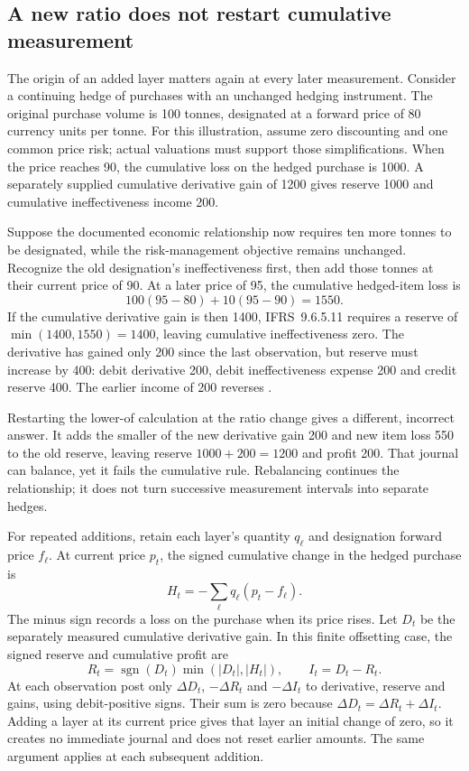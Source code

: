 \subsection{A new ratio does not restart cumulative measurement}
\label{sec:repeated-item-rebalancing}

The origin of an added layer matters again at every later measurement.
Consider a continuing hedge of purchases with an unchanged hedging
instrument. The original purchase volume is 100 tonnes, designated at a
forward price of 80 currency units per tonne. For this illustration, assume
zero discounting and one common price risk; actual valuations must support
those simplifications. When the price reaches 90, the cumulative loss on
the hedged purchase is 1000. A separately supplied cumulative derivative
gain of 1200 gives reserve 1000 and cumulative ineffectiveness income 200.

Suppose the documented economic relationship now requires ten more tonnes
to be designated, while the risk-management objective remains unchanged.
Recognize the old designation's ineffectiveness first, then add those tonnes
at their current price of 90. At a later price of 95, the cumulative
hedged-item loss is
\[
 100(95-80)+10(95-90)=1550.
\]
If the cumulative derivative gain is then 1400, IFRS~9.6.5.11 requires a
reserve of $\min(1400,1550)=1400$, leaving cumulative ineffectiveness zero.
The derivative has gained only 200 since the last observation, but reserve
must increase by 400: debit derivative 200, debit ineffectiveness expense
200 and credit reserve 400. The earlier income of 200 reverses
\citep[IFRS~9, paragraphs 6.5.11(a)--(c), B6.5.8 and B6.5.17]{eu20231803}.

Restarting the lower-of calculation at the ratio change gives a different,
incorrect answer. It adds the smaller of the new derivative gain 200 and
new item loss 550 to the old reserve, leaving reserve $1000+200=1200$ and
profit 200. That journal can balance, yet it fails the cumulative rule.
Rebalancing continues the relationship; it does not turn successive
measurement intervals into separate hedges.

For repeated additions, retain each layer's quantity $q_\ell$ and
designation forward price $f_\ell$. At current price $p_t$, the signed
cumulative change in the hedged purchase is
\[
 H_t=-\sum_\ell q_\ell(p_t-f_\ell).
\]
The minus sign records a loss on the purchase when its price rises. Let
$D_t$ be the separately measured cumulative derivative gain. In this
finite offsetting case, the signed reserve and cumulative profit are
\[
 R_t=\operatorname{sgn}(D_t)\min(|D_t|,|H_t|),
 \qquad I_t=D_t-R_t.
\]
At each observation post only $\Delta D_t$, $-\Delta R_t$ and
$-\Delta I_t$ to derivative, reserve and gains, using debit-positive
signs. Their sum is zero because $\Delta D_t=\Delta R_t+\Delta I_t$.
Adding a layer at its current price gives that layer an initial change of
zero, so it creates no immediate journal and does not reset earlier amounts.
The same argument applies at each subsequent addition.


